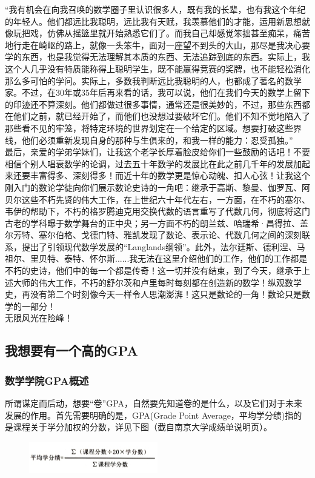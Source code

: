 \documentclass[a4paper,11pt,notitlepage]{article}
\begin{document}
\indent “我有机会在向我召唤的数学圈子里认识很多人，既有我的长辈，也有我这个年纪的年轻人。他们都远比我聪明，远比我有天赋，我羡慕他们的才能，运用新思想就像玩把戏，仿佛从摇篮里就开始熟悉它们了。而我自己却感觉笨拙甚至痴呆，痛苦地行走在崎岖的路上，就像一头笨牛，面对一座望不到头的大山，那尽是我决心要学的东西，也是我觉得无法理解其本质的东西、无法追踪到底的东西。实际上，我这个人几乎没有特质能称得上聪明学生，既不能赢得竞赛的奖牌，也不能轻松消化那么多可怕的学问。实际上，多数我判断远比我聪明的人，也都成了著名的数学家。不过，在30年或35年后再来看的话，我可以说，他们在我们今天的数学上留下的印迹还不算深刻。他们都做过很多事情，通常还是很美妙的，不过，那些东西都在他们之前，就已经开始了，而他们也没想过要破坏它们。他们不知不觉地陷入了那些看不见的牢笼，将特定环境的世界划定在一个给定的区域。想要打破这些界线，他们必须重新发现自身的那种与生俱来的，和我一样的能力：忍受孤独。”\\
\indent 最后，亲爱的学弟学妹们，让我这个老学长厚着脸皮给你们一些鼓励的话吧！不要相信个别人唱衰数学的论调，过去五十年数学的发展比在此之前几千年的发展加起来还要丰富得多、深刻得多！而近十年的数学更是惊心动魄、扣人心弦！让我这个刚入门的数论学徒向你们展示数论史诗的一角吧：继承于高斯、黎曼、伽罗瓦、阿贝尔这些不朽先贤的伟大工作，在上世纪六十年代左右，一方面，在不朽的塞尔、韦伊的帮助下，不朽的格罗腾迪克用交换代数的语言重写了代数几何，彻底将这门古老的学科曝于数学舞台的正中央；另一方面不朽的朗兰兹、哈瑞希·昌得拉、盖尔芳特、塞尔伯格、戈德门特、雅凯发现了数论、表示论、代数几何之间的深刻联系，提出了引领现代数学发展的“Langlands纲领”。此外，法尔廷斯、德利涅、马祖尔、里贝特、泰特、怀尔斯......我无法在这里介绍他们的工作，他们的工作都是不朽的史诗，他们中的每一个都是传奇！这一切并没有结束，到了今天，继承于上述大师的伟大工作，不朽的舒尔茨和卢里每时每刻都在创造新的数学！纵观数学史，再没有第二个时刻像今天一样令人思潮澎湃！这只是数论的一角！数论只是数学的一部分！\\
\indent 无限风光在险峰！


\subsection{我想要有一个高的GPA}
\subsubsection{数学学院GPA概述}\label{数学学院GPA概述}
所谓谋定而后动，想要“卷”GPA，自然要先知道卷的是什么，以及它们对于未来发展的作用。首先需要明确的是，GPA(Grade Point Average，平均学分绩)指的是课程关于学分加权的分数，详见下图（截自南京大学成绩单说明页）。\\
\begin{figure}[ht]
\centering
\includegraphics[width=0.5\textwidth]{GPA说明.png}
\end{figure}
\end{document}
